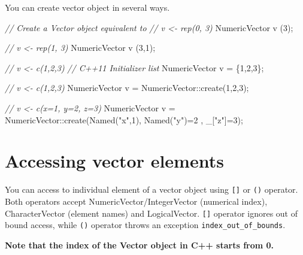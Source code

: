 \documentclass[]{book}
\newenvironment{Shaded}{\begin{snugshade}}{\end{snugshade}}
\newcommand{\CommentTok}[1]{\textcolor[rgb]{0.56,0.35,0.01}{\textit{#1}}}
\newcommand{\DecValTok}[1]{\textcolor[rgb]{0.00,0.00,0.81}{#1}}
\newcommand{\NormalTok}[1]{#1}
\newcommand{\StringTok}[1]{\textcolor[rgb]{0.31,0.60,0.02}{#1}}
\begin{document}
You can create vector object in several ways.

\begin{Shaded}
\begin{Highlighting}[]
\CommentTok{// Create a Vector object equivalent to}
\CommentTok{// v <- rep(0, 3)}
\NormalTok{NumericVector v (}\DecValTok{3}\NormalTok{);}

\CommentTok{// v <- rep(1, 3)}
\NormalTok{NumericVector v (}\DecValTok{3}\NormalTok{,}\DecValTok{1}\NormalTok{);}

\CommentTok{// v <- c(1,2,3) }
\CommentTok{// C++11 Initializer list}
\NormalTok{NumericVector v = \{}\DecValTok{1}\NormalTok{,}\DecValTok{2}\NormalTok{,}\DecValTok{3}\NormalTok{\}; }

\CommentTok{// v <- c(1,2,3)}
\NormalTok{NumericVector v = NumericVector::create(}\DecValTok{1}\NormalTok{,}\DecValTok{2}\NormalTok{,}\DecValTok{3}\NormalTok{);}

\CommentTok{// v <- c(x=1, y=2, z=3)}
\NormalTok{NumericVector v =}
\NormalTok{  NumericVector::create(Named(}\StringTok{"x"}\NormalTok{,}\DecValTok{1}\NormalTok{), Named(}\StringTok{"y"}\NormalTok{)=}\DecValTok{2}\NormalTok{ , _[}\StringTok{"z"}\NormalTok{]=}\DecValTok{3}\NormalTok{);}
\end{Highlighting}
\end{Shaded}

\hypertarget{accessing-vector-elements}{%
\section{Accessing vector elements}\label{accessing-vector-elements}}

You can access to individual element of a vector object using \texttt{{[}{]}} or \texttt{()} operator. Both operators accept NumericVector/IntegerVector (numerical index), CharacterVector (element names) and LogicalVector. \texttt{{[}{]}} operator ignores out of bound access, while \texttt{()} operator throws an exception \texttt{index\_out\_of\_bounds}.

\textbf{Note that the index of the Vector object in C++ starts from 0.}
\end{document}
